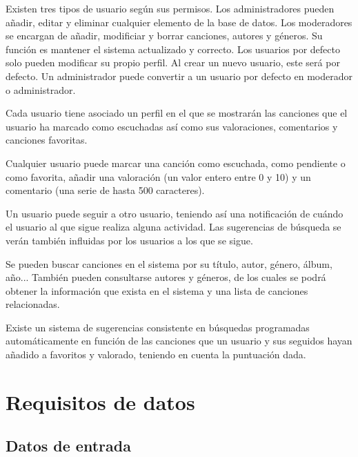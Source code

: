 \documentclass[
  12pt,
  a4paper,
  DIV=12,
  spanish,
]{scrartcl}
\begin{document}
Existen tres tipos de usuario según sus permisos. Los administradores pueden añadir, editar y eliminar cualquier elemento de la base de datos. Los moderadores se encargan de añadir, modificiar y borrar canciones, autores y géneros. Su función es mantener el sistema actualizado y correcto. Los usuarios por defecto solo pueden modificar su propio perfil. Al crear un nuevo usuario, este será por defecto. Un administrador puede convertir a un usuario por defecto en moderador o administrador.

Cada usuario tiene asociado un perfil en el que se mostrarán las canciones que el usuario ha marcado como escuchadas así como sus valoraciones, comentarios y canciones favoritas. 


Cualquier usuario puede marcar una canción como escuchada, como pendiente o como favorita, añadir una valoración (un valor entero entre 0 y 10) y un comentario (una serie de hasta 500 caracteres). 

Un usuario puede seguir a otro usuario, teniendo así una notificación de cuándo el usuario al que sigue realiza alguna actividad. Las sugerencias de búsqueda se verán también influidas por los usuarios a los que se sigue. 



Se pueden buscar canciones en el sistema por su título, autor, género, álbum, año... También pueden consultarse autores y géneros, de los cuales se podrá obtener la información que exista en el sistema y una lista de canciones relacionadas. 

Existe un sistema de sugerencias consistente en búsquedas programadas automáticamente en función de las canciones que un usuario y sus seguidos hayan añadido a favoritos y valorado, teniendo en cuenta la puntuación dada.

\section{Requisitos de datos}
\subsection{Datos de entrada}
\end{document}
